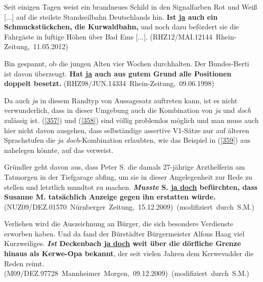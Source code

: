 \begin{exe}
	\ex\label{355} 
	\scriptsize
	Seit einigen Tagen weist ein brandneues Schild in den Signalfarben Rot und Weiß [...] auf die steilste Standseilbahn Deutschlands hin. \textbf{Ist 			\underline{ja} auch ein Schmuckstückchen, die Kurwaldbahn,} und noch dazu befördert sie die Fahrgäste in luftige Höhen über Bad Ems [...].
	\newline
	\hbox{}\hfill\hbox{(RHZ12/MAI.12144 Rhein-Zeitung, 11.05.2012)}	
\end{exe}

\begin{exe}
	\ex\label{356} 
	\scriptsize
	Bin gespannt, ob die jungen Alten vier Wochen durchhalten. Der Bundes-Berti ist davon überzeugt. \textbf{Hat \underline{ja} auch aus gutem Grund alle Positionen 		doppelt besetzt. }
	\newline
	\hbox{}\hfill\hbox{(RHZ98/JUN.14334 Rhein-Zeitung, 09.06.1998)}	
\end{exe}					                                   
Da auch \textit{ja} in diesem Randtyp von Aussagesatz auftreten kann, ist es nicht verwunderlich, dass in dieser Umgebung auch die Kombination von \textit{ja} und \textit{doch} zulässig ist. (\ref{357}) und (\ref{358}) sind völlig problemlos möglich und man muss auch hier nicht davon ausgehen, dass selbständige assertive V1-Sätze nur auf älteren Sprachstufen die \textit{ja doch}-Kombination erlaubten, wie das Beispiel in (\ref{359}) aus \citet{Oppenrieder1987} nahelegen könnte, auf das \citet[158, Fn 186]{Oennerfors1997} verweist.
 
\begin{exe}
	\ex\label{357} 
	\scriptsize
	Gründler geht davon aus, dass Peter S. die damals 27-jährige Arzthelferin am Tatmorgen in der Tiefgarage abfing, um sie in dieser Angelegenheit zur Rede zu stellen und letztlich mundtot zu machen. \textbf{\textit{Musste} S. \underline{ja doch} befürchten, dass Susanne M. tatsächlich Anzeige gegen ihn erstatten würde. }		   
	\newline
	\hbox{}\hfill\hbox{(NUZ09/DEZ.01570 Nürnberger Zeitung, 15.12.2009) (modifiziert durch S.M.)}	
\end{exe} 		
 		
\begin{exe}
	\ex\label{358} 
	\scriptsize
	Verliehen wird die Auszeichnung an Bürger, die sich besondere Verdienste erworben haben. Und da fand der Bürstädter Bürgermeister Alfons Haag viel 			Kurzweiliges. \textbf{\textit{Ist} Deckenbach \underline{ja doch} weit über die dörfliche Grenze hinaus als \glqq Kerwe-Opa\grqq{} bekannt}, der seit 		vielen Jahren dem \glqq Kerwevadder\grqq{} die Reden reimt.		   
	\hfill\hbox{(M09/DEZ.97728 Mannheimer Morgen, 09.12.2009) (modifiziert durch S.M.)}	
\end{exe} 	
							                               	
